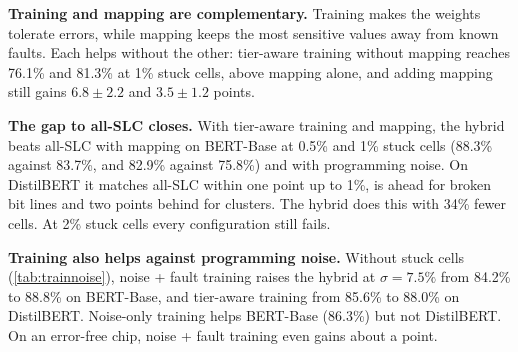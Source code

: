 \textbf{Training and mapping are complementary.} Training makes the weights tolerate errors, while mapping
keeps the most sensitive values away from known faults. Each helps without the other: tier-aware training
without mapping reaches 76.1\% and 81.3\% at 1\% stuck cells, above mapping alone, and adding mapping still
gains $6.8\pm2.2$ and $3.5\pm1.2$ points.

\textbf{The gap to all-SLC closes.} With tier-aware training and mapping, the hybrid beats all-SLC with
mapping on BERT-Base at 0.5\% and 1\% stuck cells (88.3\% against 83.7\%, and 82.9\% against 75.8\%) and
with programming noise. On DistilBERT it matches all-SLC within one point up to 1\%, is ahead for broken bit
lines and two points behind for clusters. The hybrid does this with 34\% fewer cells. At 2\% stuck cells
every configuration still fails.

\textbf{Training also helps against programming noise.} Without stuck cells (\cref{tab:trainnoise}),
noise + fault training raises the hybrid at $\sigma=7.5\%$ from 84.2\% to 88.8\% on BERT-Base, and
tier-aware training from 85.6\% to 88.0\% on DistilBERT. Noise-only training helps BERT-Base (86.3\%) but
not DistilBERT. On an error-free chip, noise + fault training even gains about a point.
